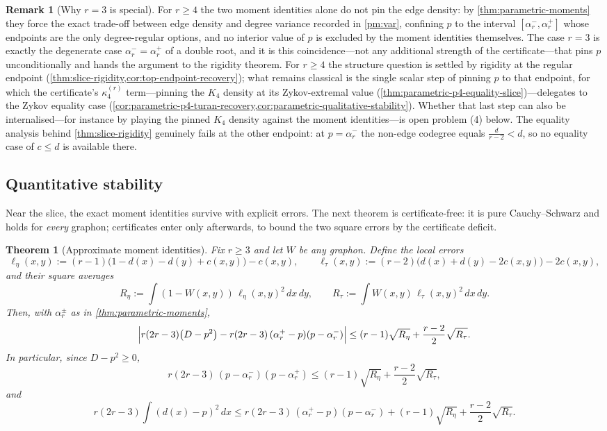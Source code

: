 \documentclass[11pt]{article}
\newtheorem{theorem}{Theorem}
\theoremstyle{definition}
\newtheorem{remark}[remark]{Remark}
\begin{document}
\begin{remark}[Why $r=3$ is special]\label{rem:r3-special}
For $r\ge4$ the two moment identities alone do not pin the edge density: by
\cref{thm:parametric-moments} they force the exact trade-off between edge density and
degree variance recorded in \ref{pm:var}, confining $p$ to the interval
$[\alpha_r^-,\alpha_r^+]$ whose endpoints are the only degree-regular options, and no
interior value of $p$ is excluded by the moment identities themselves.  The case $r=3$
is exactly the degenerate case $\alpha_r^-=\alpha_r^+$ of a double root, and it is this
coincidence---not any additional strength of the certificate---that pins $p$
unconditionally and hands the argument to the rigidity theorem.  For $r\ge4$ the
structure question is settled by rigidity at the regular endpoint
(\cref{thm:slice-rigidity,cor:top-endpoint-recovery}); what remains classical is the
single scalar step of pinning $p$ to that endpoint, for which the certificate's
$\kappa_4^{(r)}$ term---pinning the $K_4$ density at its Zykov-extremal value
(\cref{thm:parametric-p4-equality-slice})---delegates to the Zykov equality case
(\cref{cor:parametric-p4-turan-recovery,cor:parametric-qualitative-stability}).
Whether that last step can also be internalised---for instance by playing the pinned
$K_4$ density against the moment identities---is open problem (4) below.  The equality
analysis behind \cref{thm:slice-rigidity} genuinely fails at the other endpoint: at
$p=\alpha_r^-$ the non-edge codegree equals $\frac{d}{r-2}<d$, so no equality case of
$c\le d$ is available there.
\end{remark}

\subsection{Quantitative stability}

Near the slice, the exact moment identities survive with explicit errors.  The next
theorem is certificate-free: it is pure Cauchy--Schwarz and holds for \emph{every}
graphon; certificates enter only afterwards, to bound the two square errors by the
certificate deficit.

\begin{theorem}[Approximate moment identities]\label{thm:approximate-moments}
Fix $r\ge3$ and let $W$ be any graphon.  Define the local errors
\[
  \ell_\eta(x,y):=(r-1)\bigl(1-d(x)-d(y)+c(x,y)\bigr)-c(x,y),
  \qquad
  \ell_\tau(x,y):=(r-2)\bigl(d(x)+d(y)-2c(x,y)\bigr)-2c(x,y),
\]
and their square averages
\[
  R_\eta:=\int(1-W(x,y))\,\ell_\eta(x,y)^2\,dx\,dy,
  \qquad
  R_\tau:=\int W(x,y)\,\ell_\tau(x,y)^2\,dx\,dy .
\]
Then, with $\alpha_r^\pm$ as in \cref{thm:parametric-moments},
\[
  \Bigl|
  r(2r-3)\bigl(D-p^2\bigr)
  -
  r(2r-3)\,(\alpha_r^+-p)(p-\alpha_r^-)
  \Bigr|
  \le
  (r-1)\sqrt{R_\eta}+\frac{r-2}{2}\sqrt{R_\tau}.
\]
In particular, since $D-p^2\ge0$,
\[
  r(2r-3)\,(p-\alpha_r^-)(p-\alpha_r^+)
  \le
  (r-1)\sqrt{R_\eta}+\frac{r-2}{2}\sqrt{R_\tau},
\]
and
\[
  r(2r-3)\int(d(x)-p)^2\,dx
  \le
  r(2r-3)\,(\alpha_r^+-p)(p-\alpha_r^-)
  +
  (r-1)\sqrt{R_\eta}+\frac{r-2}{2}\sqrt{R_\tau}.
\]
\end{theorem}
\end{document}
